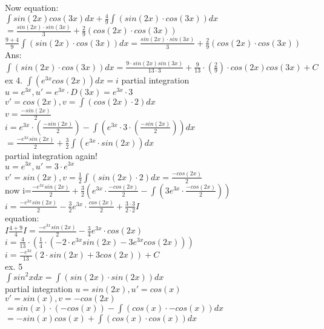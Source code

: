 \documentclass{article}
\begin{document}
  Now equation:\\
  $\int sin(2x)cos(3x) dx+ \frac{4}{9}\int (sin(2x)\cdot cos(3x))dx$\\
  $=\frac{sin(2x)\cdot sin(3x)}{3}+\frac{2}{9}(cos(2x)\cdot cos(3x))$\\
  $\frac{9+4}{9}\int(sin(2x)\cdot cos(3x))dx=\frac{sin(2x)\cdot sin(3x)}{3}+\frac{2}{9}(cos(2x)\cdot cos(3x))$\\
  Ans: $\int(sin(2x)\cdot cos(3x))dx=\frac{9\cdot sin(2x)sin(3x)}{13\cdot3}+\frac{9}{13}\cdot(\frac{2}{9})\cdot cos(2x)cos(3x)+C$\\
  ex 4. $\int (e^{3x}cos(2x))dx=i$ partial integration\\
  $u=e^{3x}, u'=e^{3x}\cdot D(3x)=e^{3x}\cdot 3$\\
  $v'=cos(2x), v=\int(cos(2x)\cdot2)dx$\\
  $v=\frac{-sin(2x)}{2}$\\
  $i=e^{3x}\cdot(\frac{-sin(2x)}{2})-\int (e^{3x}\cdot 3\cdot (\frac{-sin(2x)}{2}))dx$\\
  $=\frac{-e^{3x}sin(2x)}{2}+\frac{3}{2}\int(e^{3x}\cdot sin(2x))dx$\\
  partial integration again!\\
  $u=e^{3x}, u'=3\cdot e^{3x}$\\
  $v'=sin(2x), v=\frac{1}2{}\int(sin(2x)\cdot 2)dx=\frac{-cos(2x)}{2}$\\
  now i=$\frac{-e^{3x}sin(2x)}{2}+\frac{3}{2}(e^{3x}\cdot \frac{-cos(2x)}{2}-\int(3e^{3x}\cdot\frac{-cos(2x)}{2}))$\\
  $i=\frac{-e^{3x}sin(2x)}{2}-\frac{3}{2}e^{3x}\cdot\frac{cos(2x)}{2}+\frac{3\cdot3}{2\cdot2}I$\\
  equation:\\
  $I\frac{4+9}{4}I=\frac{-e^{3x}sin(2x)}{2}-\frac{3}{4}e^{3x}\cdot cos(2x)$\\
  $i=\frac{4}{13}\cdot (\frac{1}{4}\cdot(-2\cdot e^{3x}sin(2x)-3e^{3x}cos(2x)))$\\
  $i=\frac{-e^{3x}}{13}(2\cdot sin(2x)+3cos(2x))+C$\\
  ex. 5\\
  $\int sin^2x dx=\int (sin(2x)\cdot sin(2x))dx$\\
  partial integration $u=sin(2x), u'=cos(x)$\\
  $v'=sin(x),v=-cos(2x)$\\
  $=sin(x)\cdot (-cos(x))-\int(cos(x)\cdot -cos(x))dx$\\
  $=-sin(x)cos(x)+\int (cos(x)\cdot cos(x))dx$\\
\end{document}
